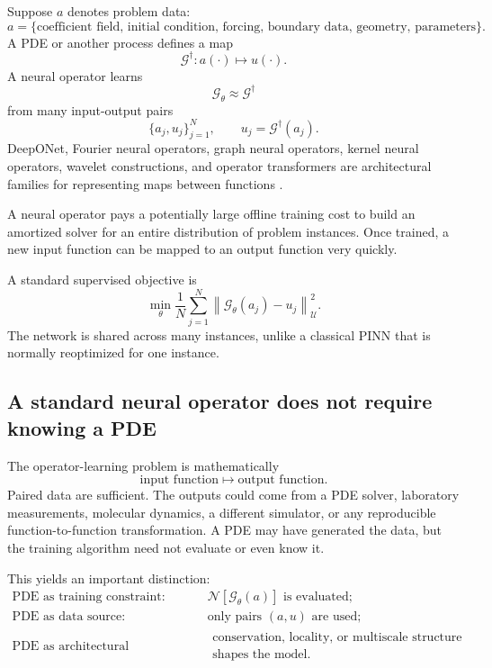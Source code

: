 \documentclass[11pt]{article}
\newcommand{\G}{\mathcal{G}}
\newcommand{\N}{\mathcal{N}}
\begin{document}
Suppose \(a\) denotes problem data:
\[
 a=
 \{\text{coefficient field, initial condition, forcing, boundary data, geometry, parameters}\}.
\]
A PDE or another process defines a map
\begin{equation}
 \G^\dagger:a(\cdot)\longmapsto u(\cdot).
\end{equation}
A neural operator learns
\[
 \G_\theta\approx\G^\dagger
\]
from many input-output pairs
\[
 \{a_j,u_j\}_{j=1}^{N},
 \qquad
 u_j=\G^\dagger(a_j).
\]
DeepONet, Fourier neural operators, graph neural operators, kernel neural operators, wavelet constructions, and operator transformers are architectural families for representing maps between functions \citep{lu2021deeponet,li2021fno,kovachki2023neuraloperator}.

\begin{bigidea}
A neural operator pays a potentially large offline training cost to build an amortized solver for an entire distribution of problem instances. Once trained, a new input function can be mapped to an output function very quickly.
\end{bigidea}

A standard supervised objective is
\begin{equation}
 \min_\theta
 \frac1N\sum_{j=1}^{N}
 \left\|\G_\theta(a_j)-u_j\right\|_{\mathcal{U}}^2.
\end{equation}
The network is shared across many instances, unlike a classical PINN that is normally reoptimized for one instance.

\subsection{A standard neural operator does not require knowing a PDE}

The operator-learning problem is mathematically
\[
 \text{input function}\longmapsto\text{output function}.
\]
Paired data are sufficient. The outputs could come from a PDE solver, laboratory measurements, molecular dynamics, a different simulator, or any reproducible function-to-function transformation. A PDE may have generated the data, but the training algorithm need not evaluate or even know it.

This yields an important distinction:
\begin{align*}
\text{PDE as training constraint:}&\quad
\N[\G_\theta(a)]\text{ is evaluated};\\
\text{PDE as data source:}&\quad
\text{only pairs }(a,u)\text{ are used};\\
\text{PDE as architectural inspiration:}&\quad
\begin{gathered}
\text{conservation, locality, or multiscale structure}\\
\text{shapes the model.}
\end{gathered}
\end{align*}
\end{document}
